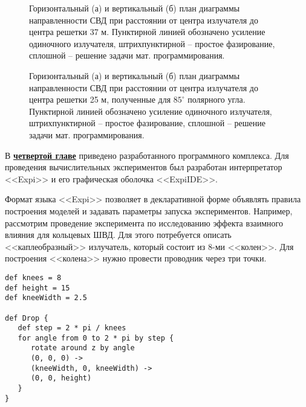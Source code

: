 \begin{figure}
\begin{minipage}[h]{0.49\linewidth}
\end{minipage}
\hfill
\begin{minipage}[h]{0.49\linewidth}
\end{minipage}
\caption{Горизонтальный (а) и вертикальный (б) план диаграммы направленности СВД при расстоянии от центра излучателя до центра решетки 37 м. Пунктирной линией обозначено усиление одиночного излучателя, штрихпунктирной – простое фазирование, сплошной – решение задачи мат. программирования.}
\label{pic:r_svd_result}
\end{figure}

\begin{figure}
\begin{minipage}[h]{0.49\linewidth}
\end{minipage}
\hfill
\begin{minipage}[h]{0.49\linewidth}
\end{minipage}
\caption{Горизонтальный (а) и вертикальный (б) план диаграммы направленности СВД при расстоянии от центра излучателя до центра решетки 25 м, полученные для $85^{\circ}$ полярного угла. Пунктирной линией обозначено усиление одиночного излучателя, штрихпунктирной – простое фазирование, сплошной – решение задачи мат. программирования.}
\label{pic:r_svd_result_1}
\end{figure}

В \underline{\textbf{четвертой главе}} приведено разработанного программного комплекса. Для проведения вычислительных экспериментов был разработан интерпретатор <<Expi>> и его графическая оболочка <<ExpiIDE>>.

Формат языка <<Expi>> позволяет в декларативной форме объявлять правила построения моделей и задавать параметры запуска экспериментов. Например, рассмотрим проведение эксперимента по исследованию эффекта взаимного влияния для кольцевых ШВД. Для этого потребуется описать <<каплеобразный>> излучатель, который состоит из 8-ми <<колен>>. Для построения <<колена>> нужно провести проводник через три точки.
\begin{lstlisting}
def knees = 8
def height = 15
def kneeWidth = 2.5

def Drop {
   def step = 2 * pi / knees
   for angle from 0 to 2 * pi by step {
      rotate around z by angle
      (0, 0, 0) -> 
      (kneeWidth, 0, kneeWidth) -> 
      (0, 0, height)
   }
}

\end{lstlisting}   

